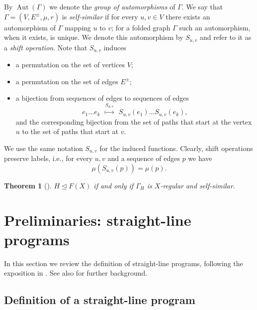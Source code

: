 \documentclass[12pt,oneside]{amsart}
\newtheorem{theorem}{Theorem}[section]
\theoremstyle{definition}
\theoremstyle{case}
\DeclareMathOperator{\Aut}{{Aut}}
\begin{document}
By $\Aut(\Gamma)$ we denote the \emph{group of automorphisms} of $\Gamma$.
We say that $\Gamma = (V,E^\pm,\mu,r)$ is \emph{self-similar} if
for every $u,v \in V$ there exists an automorphism of $\Gamma$ mapping $u$ to $v$; 
for a folded graph $\Gamma$ such an automorphism, when it exists, is unique.
We denote this automorphism by $S_{u,v}$ and refer to it as a \emph{shift operation}.
Note that $S_{u,v}$ induces 
\begin{itemize}
\item 
a permutation on the set of vertices $V$;
\item 
a permutation on the set of edges $E^\pm$;
\item 
a bijection from sequences of edges 
to sequences of edges
$$
e_1\dots e_k
\ \ \stackrel{S_{u,v}}{\mapsto} \ \ 
S_{u,v}(e_1) \dots S_{u,v}(e_k),
$$
and the corresponding bijection from 
the set of paths that start at the vertex $u$ to
the set of paths that start at $v$.
\end{itemize}
We use the same notation $S_{u,v}$ for the induced functions.
Clearly, shift operations preserve labels, i.e.,
for every $u,v$ and a sequence of edges $p$ we have
$$
\mu(S_{u,v}(p)) = \mu(p).
$$

\begin{theorem}[{{\cite[Theorem 8.14]{Kapovich_Miasnikov:2002}}}]
$H\unlhd F(X)$ if and only if
$\Gamma_H$ is $X$-regular and self-similar.
\end{theorem}







\section{Preliminaries: straight-line programs}
\label{se:SLP}

In this section we review the definition of straight-line programs,
following the exposition in \cite[Chapter 19]{MSU_book:2011}.
See also \cite{lohreyCompressedWordProblem2014} for further background.

\subsection{Definition of a straight-line program}
\end{document}
